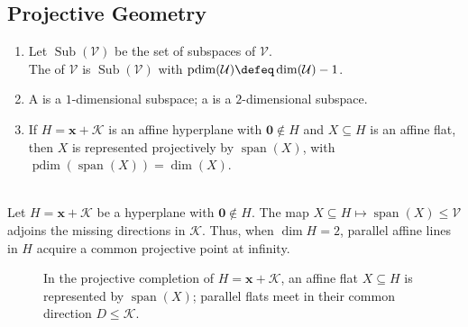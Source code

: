 \subsection{Projective Geometry}

\begin{definition} \label{def:projective-geometry-vector-space} 
\begin{enumerate}[label=(\roman*)]
\setlength{\itemsep}{0pt}
\item Let $\operatorname{Sub}(\mathcal{V})$ be the set of subspaces of $\mathcal{V}$.\\
The  of $\mathcal{V}$ is $\operatorname{Sub}(\mathcal{V})$ with $\operatorname{pdim}(\mathcal{U})\defeq\dim(\mathcal{U})-1$.
\item A  is a $1$-dimensional subspace; a  is a $2$-dimensional subspace.
\item If $H=\mathbf{x}+\mathcal{K}$ is an affine hyperplane with $\mathbf{0}\notin H$ and $X\subseteq H$ is an affine flat, then $X$ is represented projectively by $\operatorname{span}(X)$, with $\operatorname{pdim}(\operatorname{span}(X))=\dim(X)$.
\end{enumerate}
\end{definition}

\begin{perspective} \label{per:projective-completion-from-affine-hyperplane} \\
Let $H=\mathbf{x}+\mathcal{K}$ be a hyperplane with $\mathbf{0}\notin H$. The map $X\subseteq H \mapsto \operatorname{span}(X)\leq\mathcal{V}$ adjoins the missing directions in $\mathcal{K}$. Thus, when $\dim H=2$, parallel affine lines in $H$ acquire a common projective point at infinity.
\end{perspective}

\begin{figure}[H]
  \centering
  
  \caption{In the projective completion of $H=\mathbf{x}+\mathcal{K}$, an affine flat $X\subseteq H$ is represented by $\operatorname{span}(X)$; parallel flats meet in their common direction $D\leq\mathcal{K}$.}
  \label{fig:affine-projective-span-hyperplane}
\end{figure}

